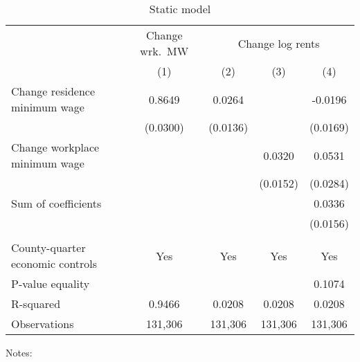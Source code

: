 \begin{table}[hbt!] \centering
    \caption{Static model}
    \label{tab:static}
    \begin{tabular}{l*{4}{c}}
        \toprule
        & \multicolumn{1}{c}{Change wrk.\ MW}
            & \multicolumn{3}{c}{Change log rents}                            \\ \cmidrule(lr){2-2}\cmidrule(lr){3-5}
                                           & (1)   & (2)   & (3)   & (4)      \\ \midrule
        Change residence minimum wage      &  0.8649  &  0.0264  &       &  -0.0196     \\
                                           & (0.0300) & (0.0136) &       & (0.0169)    \\
        Change workplace minimum wage      &       &       &  0.0320  & 0.0531      \\
                                           &       &       & (0.0152) & (0.0284)    \\ \midrule
        Sum of coefficients                &       &       &       &  0.0336     \\
                                           &       &       &       & (0.0156)    \\
                                           &       &       &       &          \\ \midrule
        County-quarter economic controls   &  Yes  & Yes   & Yes   & Yes      \\
        P-value equality                   &       &       &       & 0.1074      \\
        R-squared                          &  0.9466  &  0.0208  &  0.0208  & 0.0208      \\
        Observations                       & 131,306  & 131,306  & 131,306  & 131,306     \\\bottomrule
    \end{tabular}

    \begin{minipage}{.95\textwidth} \footnotesize
        \vspace{2mm}
        Notes: 
    \end{minipage}
\end{table}
